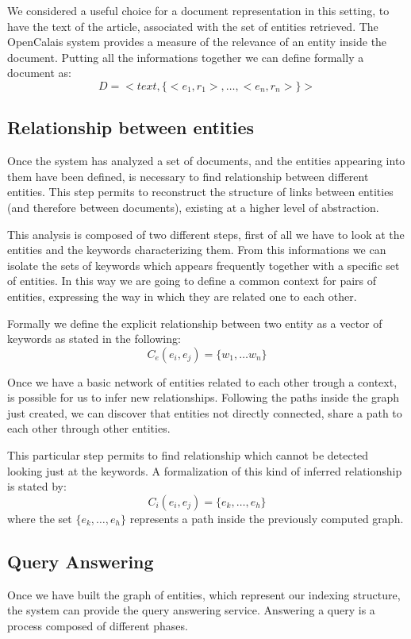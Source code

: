 \documentclass{acm_proc_article-sp-sigmod07}
\begin{document}
We considered a useful choice for a document representation in this
setting, to have the text of the article, associated with the set of
entities retrieved.
The OpenCalais system provides a measure of the relevance of an entity
inside the document.
Putting all the informations together we can define formally a document
as:
$$
D = <text, \{<e_{1},r_{1}>, \dots, <e_{n}, r_{n}>\}>
$$

\subsection{Relationship between entities}
Once the system has analyzed a set of documents, and the entities
appearing into them have been defined, is necessary to find relationship
between different entities. This step permits to reconstruct the structure
of links between entities (and therefore between documents), existing at a
higher level of abstraction.

This analysis is composed of two different steps, first of all we have to
look at the entities and the keywords characterizing them.
From this informations we can isolate the sets of keywords which appears
frequently together with a specific set of entities.
In this way we are going to define a common context for pairs of entities,
expressing the way in which they are related one to each other.

Formally we define the explicit relationship between two entity as a
vector of keywords as stated in the following:
$$
C_{e}(e_{i}, e_{j}) = \{w_{1}, \dots w_{n}\}
$$

Once we have a basic network of entities related to each other trough
a context, is possible for us to infer new relationships. Following the
paths inside the graph just created, we can discover that entities not
directly connected, share a path to each other through other entities.

This particular step permits to find relationship which cannot be detected
looking just at the keywords. A formalization of this kind of inferred
relationship is stated by:
$$
C_{i}(e_{i}, e_{j}) = \{e_{k}, \dots, e_{h}\}
$$
where the set $\{e_{k}, \dots, e_{h}\}$ represents a path inside the
previously computed graph.

\subsection{Query Answering}
Once we have built the graph of entities, which represent our indexing
structure, the system can provide the query answering service.
Answering a query is a process composed of different phases.
\end{document}
